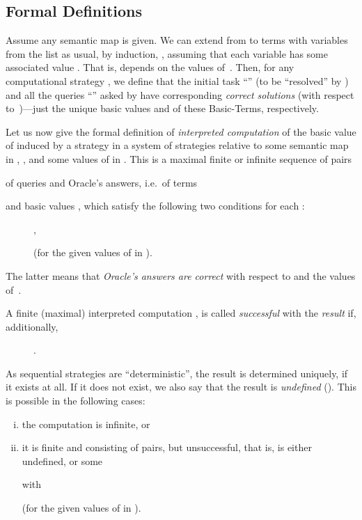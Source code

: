 \documentclass[fleqn]{LMCS}
\theoremstyle{plain}\newtheorem{satz}[thm]{Satz}
\theoremstyle{plain}\newtheorem{hyp}[thm]{Hypothesis}
\theoremstyle{plain}\newtheorem{hyps}[thm]{Hypotheses}
\theoremstyle{definition}\newtheorem{note}[thm]{Note}
\newcommand{\?}{\mbox{?}}
\begin{document}
\subsection{Formal Definitions}
\label{sec:seq-stra-den-sem-formal-def}


Assume any semantic map  is given. 
We can extend  from  to terms  
with variables from the list  
as usual, by induction, 
, assuming that each variable  
has some associated value . 
That is,  depends on the values of~.
Then, for any computational strategy 
, 
we define that the initial task ``'' (to be ``resolved'' 
by ) and 
all the queries 
``'' asked by  have
corresponding \emph{correct solutions} 
(with respect to~)---just the unique basic values 
 and  
of these \mbox{Basic-Terms}, respectively. 




























Let us now give the formal definition of \emph{interpreted computation} of the basic 
value of 
 induced by a strategy  
in a system of strategies 
relative to some semantic map in 
, , and some values of  in . 
This is a maximal finite or infinite 
sequence of pairs 

of queries and Oracle's answers, 
i.e.\ of terms 
 
and basic values , which satisfy the following 
two conditions for 
each :
\begin{description}
\item [] 
, 
\item [] 
 
(for the given values of  in ). 
\end{description}
The latter means that \emph{Oracle's answers  are correct} with respect to 
 and the values of~.

A finite (maximal) interpreted computation , 
is called 
\emph{successful} with the \emph{result}  
if, additionally, 
\begin{description}
\item 
[] . 
\end{description}
As sequential strategies are ``deterministic'', 
the result  is determined uniquely, 
if it exists at all. 
If it does not exist, we also 
say that the result is \emph{undefined} (). 
This is possible in the following cases: 
\begin{enumerate}[(i)]
\item the computation is infinite, or 
\item it is finite and consisting of  pairs, 
but unsuccessful, 
that is,  is either undefined, or  some 
 
with 

(for the given values of  in ). 
\end{enumerate}
\end{document}
